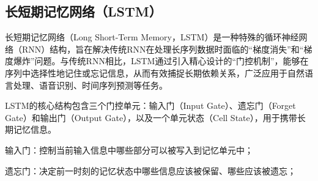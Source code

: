 

\subsection{长短期记忆网络（LSTM）}

长短期记忆网络（Long Short-Term Memory，LSTM）\cite{graves2012long}是一种特殊的循环神经网络（RNN）结构，旨在解决传统RNN在处理长序列数据时面临的“梯度消失”和“梯度爆炸”问题。与传统RNN相比，LSTM通过引入精心设计的“门控机制”，能够在序列中选择性地记住或忘记信息，从而有效捕捉长期依赖关系，广泛应用于自然语言处理、语音识别、时间序列预测等任务。


LSTM的核心结构包含三个门控单元：输入门（Input Gate）、遗忘门（Forget Gate）和输出门（Output Gate），以及一个单元状态（Cell State），用于携带长期记忆信息。


输入门：控制当前输入信息中哪些部分可以被写入到记忆单元中；


遗忘门：决定前一时刻的记忆状态中哪些信息应该被保留、哪些应该被遗忘；


